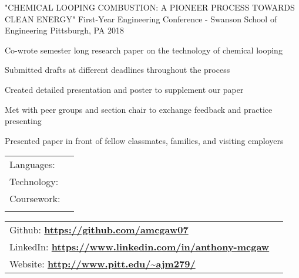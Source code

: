 \documentclass[]{awesome-cv}
\begin{document}
\begin{cventries}
	\cventry
	{"CHEMICAL LOOPING COMBUSTION: A PIONEER PROCESS TOWARDS CLEAN ENERGY"}
	{First-Year Engineering Conference - Swanson School of Engineering}
	{Pittsburgh, PA}
	{2018}
	{\begin{cvitems}
		\item {Co-wrote semester long research paper on the technology of chemical looping}
		\item {Submitted drafts at different deadlines throughout the process}
		\item {Created detailed presentation and poster to supplement our paper}
		\item {Met with peer groups and section chair to exchange feedback and practice presenting }
		\item {Presented paper in front of fellow classmates, families, and visiting employers }
		\end{cvitems}}
	
	\vspace{-3mm}
\end{cventries}
\begin{cventries}
	\cventry
	{}
	{\def\arraystretch{1.15}{\begin{tabular}{ l l }
		Languages:  & {\skill{ Java, C, C++, Python, JavaScript, HTML, CSS}} \\
		Technology:  & {\skill{Node.js, Vue.js, Microsoft Office, Git/Github, UNIX, Google App Engine, Photoshop}} \\
		Coursework:  & {\skill{ Web Applications, OS, Algorithims, Data Structures, Discrete Mathematics,}} \\
		 		    & {\skill{    Computer Organization, Calculus I-III, Written Professional Communication}} \\
		\end{tabular}}}
	{}
	{}
	{}
\end{cventries}

\vspace{-11mm}
\begin{cventries}
	\cventry
	{}
	{\def\arraystretch{1.20}{\begin{tabular}{ l l }
		Github:		\href{https://github.com/amcgaw07}{\bf 	https://github.com/amcgaw07} \\
		LinkedIn:	\href{https://www.linkedin.com/in/anthony-mcgaw/}{\bf https://www.linkedin.com/in/anthony-mcgaw} \\
		Website:		\href{http://www.pitt.edu/~ajm279/}{\bf 	http://www.pitt.edu/\~{}ajm279/} \\
		\end{tabular}}}
	{}
	{}
	{}
\end{cventries}
\ 
\end{document}
